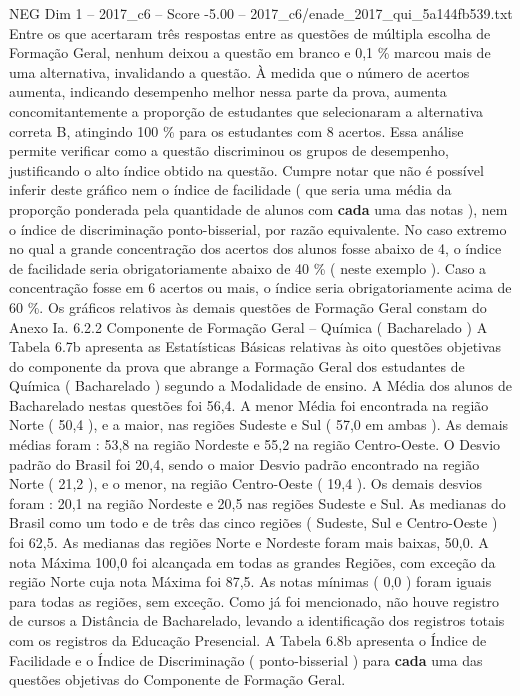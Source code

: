 \begin{textsample}{NEG Dim 1 – 2017\_c6 – Score -5.00 – 2017\_c6/enade\_2017\_qui\_5a144fb539.txt}
Entre os que acertaram três respostas entre as questões de múltipla escolha de Formação Geral, nenhum deixou a questão em branco e 0,1 \% marcou mais de uma alternativa, invalidando a questão.
À medida que o número de acertos aumenta, indicando desempenho melhor nessa parte da prova, aumenta concomitantemente a proporção de estudantes que selecionaram a alternativa correta B, atingindo 100 \% para os estudantes com 8 acertos.
Essa análise permite verificar como a questão discriminou os grupos de desempenho, justificando o alto índice obtido na questão.
Cumpre notar que não é possível inferir deste gráfico nem o índice de facilidade ( que seria uma média da proporção ponderada pela quantidade de alunos com \textbf{cada} uma das notas ), nem o índice de discriminação ponto-bisserial, por razão equivalente.
No caso extremo no qual a grande concentração dos acertos dos alunos fosse abaixo de 4, o índice de facilidade seria obrigatoriamente abaixo de 40 \% ( neste exemplo ).
Caso a concentração fosse em 6 acertos ou mais, o índice seria obrigatoriamente acima de 60 \%.
Os gráficos relativos às demais questões de Formação Geral constam do Anexo Ia. 6.2.2 Componente de Formação Geral – Química ( Bacharelado ) A Tabela 6.7b apresenta as Estatísticas Básicas relativas às oito questões objetivas do componente da prova que abrange a Formação Geral dos estudantes de Química ( Bacharelado ) segundo a Modalidade de ensino.
A Média dos alunos de Bacharelado nestas questões foi 56,4.
A menor Média foi encontrada na região Norte ( 50,4 ), e a maior, nas regiões Sudeste e Sul ( 57,0 em ambas ).
As demais médias foram : 53,8 na região Nordeste e 55,2 na região Centro-Oeste.
O Desvio padrão do Brasil foi 20,4, sendo o maior Desvio padrão encontrado na região Norte ( 21,2 ), e o menor, na região Centro-Oeste ( 19,4 ).
Os demais desvios foram : 20,1 na região Nordeste e 20,5 nas regiões Sudeste e Sul.
As medianas do Brasil como um todo e de três das cinco regiões ( Sudeste, Sul e Centro-Oeste ) foi 62,5.
As medianas das regiões Norte e Nordeste foram mais baixas, 50,0.
A nota Máxima 100,0 foi alcançada em todas as grandes Regiões, com exceção da região Norte cuja nota Máxima foi 87,5.
As notas mínimas ( 0,0 ) foram iguais para todas as regiões, sem exceção.
Como já foi mencionado, não houve registro de cursos a Distância de Bacharelado, levando a identificação dos registros totais com os registros da Educação Presencial.
A Tabela 6.8b apresenta o Índice de Facilidade e o Índice de Discriminação ( ponto-bisserial ) para \textbf{cada} uma das questões objetivas do Componente de Formação Geral.

\end{textsample}

